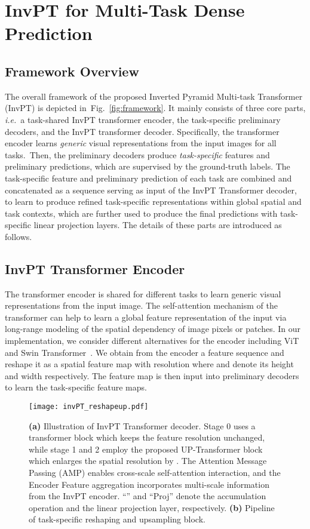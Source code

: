 \documentclass[runningheads]{llncs}
\newcommand*{\ie}{\emph{i.e.}}
\begin{document}
\section{InvPT for Multi-Task Dense Prediction}
\subsection{Framework Overview}
The overall framework of the proposed Inverted Pyramid Multi-task Transformer (InvPT) is depicted in~Fig.~\ref{fig:framework}.
It mainly consists of three core parts, \ie~a task-shared InvPT transformer encoder, the task-specific preliminary decoders, and the InvPT transformer decoder. Specifically, the transformer encoder learns \emph{generic} visual representations from the input images for all tasks.~Then, the preliminary decoders produce \emph{task-specific} features and preliminary predictions, which are supervised by the ground-truth labels.
The task-specific feature and preliminary prediction of each task are combined and concatenated as a sequence serving as input of the InvPT Transformer decoder, to learn to produce refined task-specific representations within global spatial and task contexts, which are further used to produce the final predictions with task-specific linear projection layers. The details of these parts are introduced as follows.

\subsection{InvPT Transformer Encoder}
The transformer encoder is shared for different tasks to learn generic visual representations from the input image. The self-attention mechanism of the transformer can help to learn a global feature representation of the input via long-range modeling of the spatial dependency of image pixels or patches.
In our implementation, we consider different alternatives for the encoder including ViT~\cite{vit} and Swin Transformer~\cite{swin}. We obtain from the encoder a feature sequence and reshape it as a spatial feature map with resolution  where  and  denote its height and width respectively. The feature map is then input into  preliminary decoders to learn the  task-specific feature maps.


\begin{figure}[t]
\vspace{-10pt}
\centering
\texttt{[image: invPT\_reshapeup.pdf]}
\vspace{-10pt}
\caption{\textbf{(a)} Illustration of InvPT Transformer decoder. Stage 0 uses a transformer block which keeps the feature resolution unchanged, while stage 1 and 2 employ the proposed UP-Transformer block which enlarges the spatial resolution by . The Attention Message Passing (AMP) enables cross-scale self-attention interaction, and the Encoder Feature aggregation incorporates multi-scale information from the InvPT encoder.  ``'' and ``Proj'' denote the accumulation operation and the linear projection layer, respectively.
\textbf{(b)} Pipeline of task-specific reshaping and upsampling block.}
\label{fig:invpt_reshapeup}
\vspace{-18pt}
\end{figure}
\end{document}
